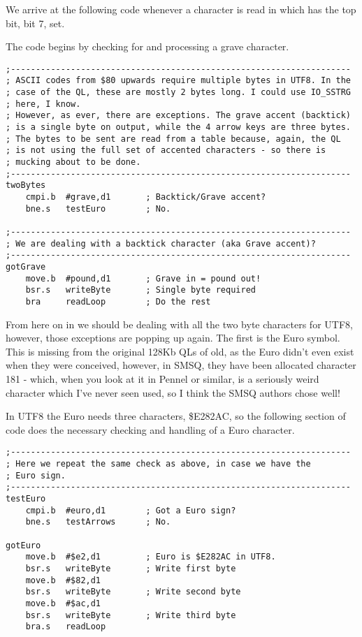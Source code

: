 We arrive at the following code whenever a character is read in which
has the top bit, bit 7, set.

The code begins by checking for and processing a grave character.

\begin{lstlisting}
;--------------------------------------------------------------------
; ASCII codes from $80 upwards require multiple bytes in UTF8. In the
; case of the QL, these are mostly 2 bytes long. I could use IO_SSTRG
; here, I know. 
; However, as ever, there are exceptions. The grave accent (backtick)
; is a single byte on output, while the 4 arrow keys are three bytes.
; The bytes to be sent are read from a table because, again, the QL
; is not using the full set of accented characters - so there is
; mucking about to be done.
;--------------------------------------------------------------------
twoBytes
    cmpi.b  #grave,d1       ; Backtick/Grave accent?
    bne.s   testEuro        ; No.

;--------------------------------------------------------------------
; We are dealing with a backtick character (aka Grave accent)?
;--------------------------------------------------------------------
gotGrave
    move.b  #pound,d1       ; Grave in = pound out!
    bsr.s   writeByte       ; Single byte required
    bra     readLoop        ; Do the rest
\end{lstlisting}

From here on in we should be dealing with all the two byte characters
for UTF8, however, those exceptions are popping up again. The first
is the Euro symbol. This is missing from the original 128Kb QLs of
old, as the Euro didn't even exist when they were conceived, however,
in SMSQ, they have been allocated character 181 - which, when you
look at it in Pennel or similar, is a seriously weird character which
I've never seen used, so I think the SMSQ authors chose well!

In UTF8 the Euro needs three characters, \$E282AC, so the following
section of code does the necessary checking and handling of a Euro
character.

\begin{lstlisting}
;--------------------------------------------------------------------
; Here we repeat the same check as above, in case we have the
; Euro sign.
;--------------------------------------------------------------------
testEuro
    cmpi.b  #euro,d1        ; Got a Euro sign?
    bne.s   testArrows      ; No.

gotEuro
    move.b  #$e2,d1         ; Euro is $E282AC in UTF8.
    bsr.s   writeByte       ; Write first byte
    move.b  #$82,d1
    bsr.s   writeByte       ; Write second byte
    move.b  #$ac,d1
    bsr.s   writeByte       ; Write third byte
    bra.s   readLoop
\end{lstlisting}

